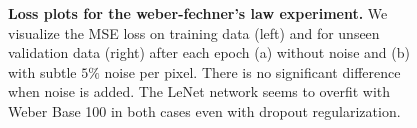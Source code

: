 \documentclass[journal]{vgtc}                %
\begin{document}
\begin{figure}[t]
	\centering
	
	\hfill

  \caption{\textbf{Loss plots for the weber-fechner's law experiment.} We visualize the MSE loss on training data (left) and for unseen validation data (right) after each epoch (a) without noise and (b) with subtle $5\%$ noise per pixel. There is no significant difference when noise is added. The LeNet network seems to overfit with Weber Base 100 in both cases even with dropout regularization.}
	\label{fig:weber_loss}
\end{figure}
\end{document}
